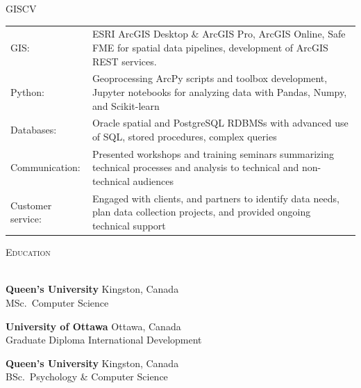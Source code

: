 \documentclass[letterpaper]{article}
\newcommand{\lineunder} {
        \vspace*{-8pt} \\
        \hspace*{-18pt} \hrulefill \\
    }
\newcommand{\header} [1] {
        {\hspace*{-18pt}\vspace*{6pt} \textsc{#1}}
        \vspace*{-6pt} \lineunder
        \vspace{1mm}
    }
\newcommand{\university}[3]{
        \textbf{#1}  %
        \hfill #2\\  %
        #3\\         %
        \vspace{2mm}
    }
\begin{document}
    \begin{taggedblock}{GISCV}
        \begin{tabular}[t]{ l L{5.17in} }
            GIS:& 
                ESRI ArcGIS Desktop \& ArcGIS Pro, ArcGIS Online, Safe FME for
                spatial data pipelines, development of ArcGIS REST services.
                \\
            Python:& 
                Geoprocessing ArcPy scripts and toolbox development, Jupyter notebooks 
                for analyzing data with Pandas, Numpy, and Scikit-learn
                \\
            Databases:& 
                Oracle spatial and PostgreSQL RDBMSs with advanced use of SQL,
                stored procedures, complex queries
                \\
            Communication: &
                Presented workshops and training seminars summarizing technical
                processes and analysis to technical and non-technical audiences
                \\
            Customer service: &
                Engaged with clients, and partners to identify data needs, plan data
                collection projects, and provided ongoing technical support
                \\
        \end{tabular}
    \end{taggedblock}

\vspace{1mm}



\header{Education}
    \university
        {Queen's University}
        {Kingston, Canada}
        {MSc.~Computer Science}

    \university
        {University of Ottawa}
        {Ottawa, Canada}
        {Graduate Diploma International Development}

    \university
        {Queen's University}
        {Kingston, Canada}
        {BSc.~Psychology \& Computer Science}
\end{document}
